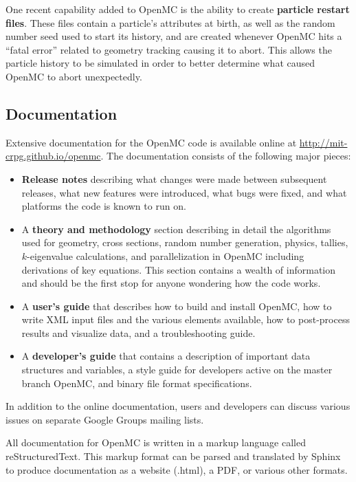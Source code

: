 \documentclass{snamc2013}
\begin{document}
One recent capability added to OpenMC is the ability to create \textbf{particle
  restart files}. These files contain a particle's attributes at birth, as well
as the random number seed used to start its history, and are created whenever
OpenMC hits a ``fatal error'' related to geometry tracking causing it to
abort. This allows the particle history to be simulated in order to better
determine what caused OpenMC to abort unexpectedly.

\subsection{Documentation}

Extensive documentation for the OpenMC code is available online at
\url{http://mit-crpg.github.io/openmc}. The documentation consists of the
following major pieces:
\begin{itemize}
\item \textbf{Release notes} describing what changes were made between
  subsequent releases, what new features were introduced, what bugs were fixed,
  and what platforms the code is known to run on.
\item A \textbf{theory and methodology} section describing in detail the
  algorithms used for geometry, cross sections, random number generation,
  physics, tallies, $k$-eigenvalue calculations, and parallelization in OpenMC
  including derivations of key equations. This section contains a wealth of
  information and should be the first stop for anyone wondering how the code
  works.
\item A \textbf{user's guide} that describes how to build and install OpenMC,
  how to write XML input files and the various elements available, how to
  post-process results and visualize data, and a troubleshooting guide.
\item A \textbf{developer's guide} that contains a description of important data
  structures and variables, a style guide for developers active on the master
  branch OpenMC, and binary file format specifications.
\end{itemize}
In addition to the online documentation, users and developers can discuss
various issues on separate Google Groups mailing lists.

All documentation for OpenMC is written in a markup language called
reStructuredText. This markup format can be parsed and translated by Sphinx
\cite{sphinx-2013} to produce documentation as a website (.html), a PDF, or
various other formats.
\end{document}
